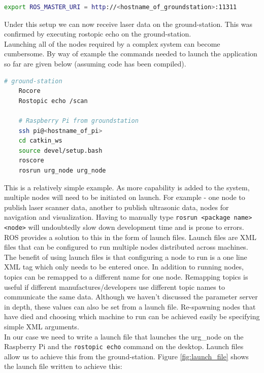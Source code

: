 \documentclass[capstone_report.tex]{subfiles}
\begin{document}
\begin{lstlisting}[language=bash]
    export ROS_MASTER_URI = http://<hostname_of_groundstation>:11311
\end{lstlisting}

Under this setup we can now receive laser data on the ground-station. This was confirmed by executing rostopic echo on the ground-station.\\

Launching all of the nodes required by a complex system can become cumbersome. By way of example the commands needed to launch the application so far are given below (assuming code has been compiled).

\begin{lstlisting}[language=bash]
    # ground-station
    Rocore 
    Rostopic echo /scan

    # Raspberry Pi from groundstation
    ssh pi@<hostname_of_pi>
    cd catkin_ws
    source devel/setup.bash
    roscore
    rosrun urg_node urg_node
\end{lstlisting}

This is a relatively simple example.  As more capability is added to the system, multiple nodes will need to be initiated on launch.  For example - one node to publish laser scanner data, another to publish ultrasonic data, nodes for navigation and visualization.  Having to manually type \texttt{rosrun <package name> <node>} will undoubtedly slow down development time and is prone to errors. \\

ROS provides a solution to this in the form of launch files. Launch files are XML files that can be configured to run multiple nodes distributed across machines.  The benefit of using launch files is that configuring a node to run is a one line XML tag which only needs to be entered once.  In addition to running nodes, topics can be remapped to a different name for one node.  Remapping topics is useful if different manufactures/developers use different topic names to communicate the same data.  Although we haven’t discussed the parameter server in depth, these values can also be set from a launch file. Re-spawning nodes that have died and choosing which machine to run can be achieved easily be specifying simple XML arguments.\\

In our case we need to write a launch file that launches the urg\_node on the Raspberry Pi and the \texttt{rostopic echo} command on the desktop.  Launch files allow us to achieve this from the ground-station.  Figure \ref{fig:launch_file} shows the launch file written to achieve this: 
\end{document}
